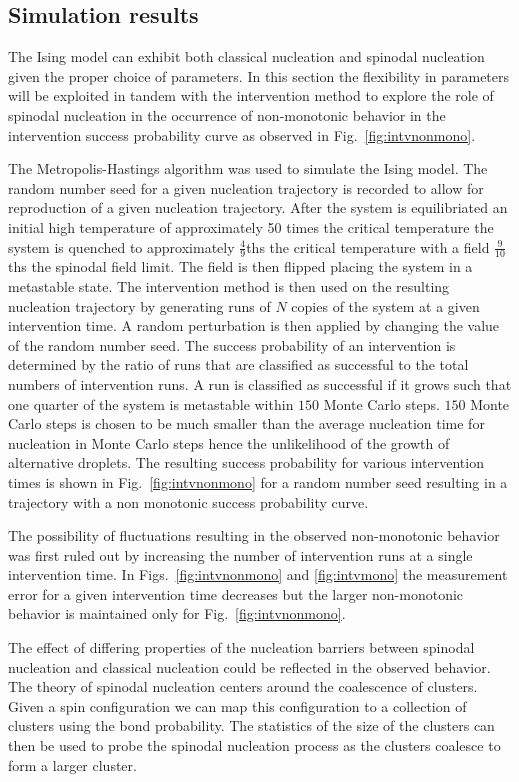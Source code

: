 \subsection{Simulation results}

The Ising model can exhibit both classical nucleation and spinodal nucleation given the proper choice of parameters. In this section the flexibility in parameters will be exploited in tandem with the intervention method to explore the role of spinodal nucleation in the occurrence of non-monotonic behavior in the intervention success probability curve as observed in Fig.~\ref{fig:intvnonmono}.

The Metropolis-Hastings algorithm was used to simulate the Ising model. The random number seed for a given nucleation trajectory is recorded to allow for reproduction of a given  nucleation trajectory. After the system is equilibriated an initial high temperature of approximately 50 times the critical temperature the system is quenched to approximately $\frac{4}{9}$ths the critical temperature with a field $\frac{9}{10}$ths the spinodal field limit. The field is then flipped placing the system in a metastable state. The intervention method is then used on the resulting nucleation trajectory by generating runs of $N$ copies of the system at a given intervention time. A random perturbation is then applied by changing the value of the random number seed. The success probability of an intervention is determined by the ratio of runs that are classified as successful to the total numbers of intervention runs. A run is classified as successful if it grows such that one quarter of the system is metastable within $150$ Monte Carlo steps. $150$ Monte Carlo steps is chosen to be much smaller than the average nucleation time for nucleation in Monte Carlo steps hence the unlikelihood of the growth of alternative droplets. The resulting success probability for various intervention times is shown in  Fig.~\ref{fig:intvnonmono} for a random number seed resulting in a trajectory with a non monotonic success probability curve.

The possibility of fluctuations resulting in the observed non-monotonic behavior was first ruled out by increasing the number of intervention runs at a single intervention time. In Figs.~\ref{fig:intvnonmono} and \ref{fig:intvmono} the measurement error for a given intervention time decreases but the larger non-monotonic behavior is maintained only for Fig.~\ref{fig:intvnonmono}. 

The effect of differing properties of the nucleation barriers between spinodal nucleation and classical nucleation could be reflected in the observed behavior. The theory of spinodal nucleation centers around the coalescence of clusters. Given a  spin  configuration we can map this configuration to a collection of clusters using the bond probability.  The statistics of the size of the  clusters can then be used to probe the spinodal nucleation process as the clusters coalesce to form a larger cluster. 

